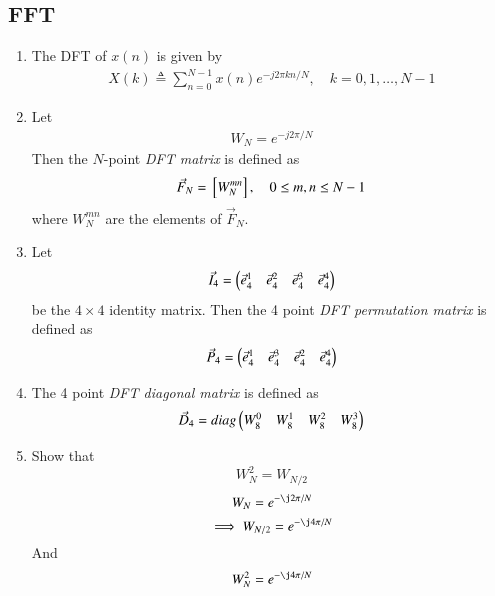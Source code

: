 \documentclass[journal,12pt,twocolumn]{IEEEtran}
\renewcommand\thesection{\arabic{section}}
\begin{document}
\begin{enumerate}[label=\thesection.\arabic*
	,ref=\thesection.\theenumi]
\section{FFT}
\begin{enumerate}[label=\arabic*.,ref=\thesection.\theenumi]
\item The DFT of $x(n)$ is given by
\begin{align}
	X(k) \triangleq \sum_{n=0}^{N-1} x(n) e^{-j 2 \pi k n / N}, \quad k=0,1, \ldots, N-1
\end{align}
\item Let 
\begin{align}
	W_{N} = e^{-j2\pi/N} 
\end{align}
Then the $N$-point {\em DFT matrix} is defined as 
\begin{align}
	\vec{F}_{N} = {}\left[W_{N}^{mn}\right], \quad 0 \le m,n \le N-1 
\end{align}
where $W_{N}^{mn}$ are the elements of $\vec{F}_{N}$.
\item Let 
\begin{align}
	\vec{I}_4 = \begin{pmatrix}\vec{e}_4^{1} &\vec{e}_4^{2} &\vec{e}_4^{3} &\vec{e}_4^{4} \end{pmatrix}
\end{align}
be the $4\times 4$ identity matrix.  Then the 4 point {\em DFT permutation matrix} is defined as 
\begin{align}
	\vec{P}_4 = \begin{pmatrix}\vec{e}_4^{1} &\vec{e}_4^{3} &\vec{e}_4^{2} &\vec{e}_4^{4} \end{pmatrix}
\end{align}
\item The 4 point {\em DFT diagonal matrix} is defined as 
\begin{align}
	\vec{D}_4 = diag\begin{pmatrix}W_{8}^{0} & W_{8}^{1} & W_{8}^{2} & W_{8}^{3}\end{pmatrix}
\end{align}
\item Show that 
\begin{equation}
	W_{N}^{2}=W_{N/2}
\end{equation}
\solution
\begin{equation}
	W_{N} = e^{-\j2\pi/N}
\end{equation}
\begin{equation}
	\implies W_{N/2} = e^{-\j4\pi/N}
\end{equation}
And
\begin{equation}
	W_{N}^{2} = e^{-\j4\pi/N}
\end{equation}

\end{enumerate}
\end{enumerate}
\end{document}
